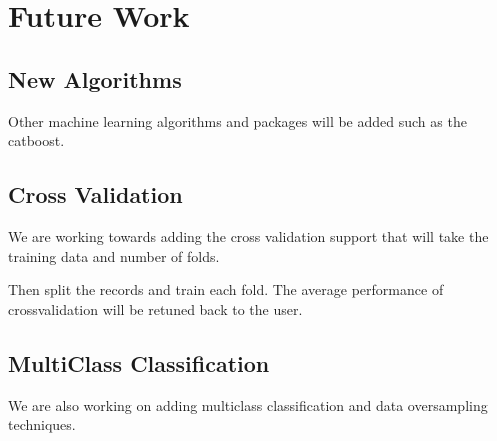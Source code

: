 \documentclass[letterpaper,10pt,english]{sphinxmanual}
\begin{document}
\chapter{Future Work}
\label{\detokenize{index:future-work}}

\section{New Algorithms}
\label{\detokenize{index:new-algorithms}}
Other machine learning algorithms and packages will be added such as the catboost.


\section{Cross Validation}
\label{\detokenize{index:cross-validation}}
We are working towards adding the cross validation support that will take the training data and number of folds.

Then split the records and train each fold. The average performance of cross\sphinxhyphen{}validation will be retuned back to the user.


\section{Multi\sphinxhyphen{}Class Classification}
\label{\detokenize{index:multi-class-classification}}
We are also working on adding multi\sphinxhyphen{}class classification and data oversampling techniques.
\end{document}
